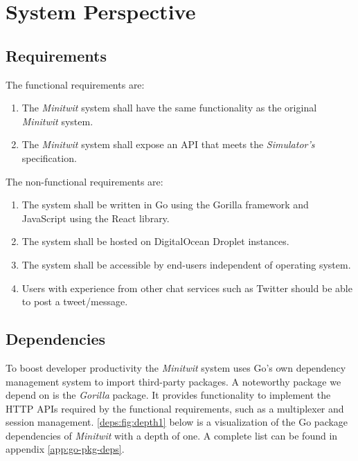 \section{System Perspective}
\label{sec:sys_perspective}

\subsection{Requirements}
\label{sec:reqs}

The functional requirements are:
\begin{enumerate}
    \item The \textit{Minitwit} system shall have the same functionality as the original \textit{Minitwit} system.
    \item The \textit{Minitwit} system shall expose an API that meets the \textit{Simulator's} specification.
\end{enumerate}

The non-functional requirements are:
\begin{enumerate}
    \item The system shall be written in Go using the Gorilla framework and JavaScript using the React library.
    \item The system shall be hosted on DigitalOcean Droplet instances.
    \item The system shall be accessible by end-users independent of operating system.
    \item Users with experience from other chat services such as Twitter should be able to post a tweet/message.
\end{enumerate}



\subsection{Dependencies}
\label{sec:deps}
To boost developer productivity the \textit{Minitwit} system uses Go's own dependency management system to import third-party packages.
A noteworthy package we depend on is the \textit{Gorilla} package.
It provides functionality to implement the HTTP APIs required by the functional requirements, such as a multiplexer and session management. 
\autoref{deps:fig:depth1} below is a visualization of the Go package dependencies of \textit{Minitwit} with a depth of one.
A complete list can be found in appendix \ref{app:go-pkg-deps}.

